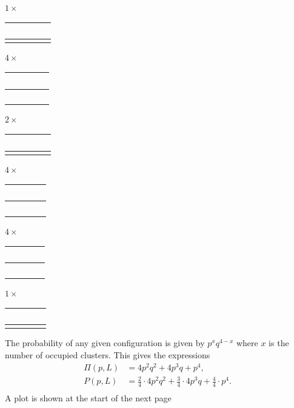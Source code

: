 \documentclass[a4paper, 11pt, notitlepage, english]{article}
\begin{document}
\begin{center}
$1\times$
\begin{tabular}{|c|c|}
  \hline
  \ \ \ &  \ \ \  \\ \hline
  \qquad & \qquad \\
  \hline
\end{tabular} \qquad
\qquad $4\times$
\begin{tabular}{|c|c|}
  \hline
  \ \ \cellcolor{black} &  \ \ \  \\ \hline
  \ \ \ & \qquad \\
  \hline
\end{tabular} \qquad 
\qquad $2\times$
\begin{tabular}{|c|c|}
  \hline
  \ \ \ & \cellcolor{black} \ \ \  \\ \hline
  \cellcolor{black} & \qquad \\
  \hline
\end{tabular}	

$4\times$
\begin{tabular}{|c|c|}
  \hline
  \ \ \cellcolor{black}&  \ \ \  \\ \hline
  \ \ \cellcolor{black} & \qquad \\
  \hline
\end{tabular} \qquad
\qquad $4\times$
\begin{tabular}{|c|c|}
  \hline
  \  \cellcolor{black} & \cellcolor{black} \ \ \  \\ \hline
  \ \  \cellcolor{black} & \qquad \\
  \hline
\end{tabular} \qquad 
\qquad $1\times$
\begin{tabular}{|c|c|}
  \hline
  \ \ \cellcolor{black} & \cellcolor{black} \ \ \  \\ \hline
  \cellcolor{black} & \cellcolor{black} \qquad \\
  \hline
\end{tabular}	
\end{center}
The probability of any given configuration is given by $p^x q^{4-x}$ where $x$ is the number of occupied clusters. This gives the expressions
\begin{align*}
\Pi(p, L) &= 4p^2q^2 + 4p^3q + p^4, \\
P(p, L) &= \frac{2}{4}\cdot 4p^2q^2 + \frac{3}{4}\cdot 4p^3q + \frac{4}{4}\cdot p^4. \\
\end{align*}
A plot is shown at the start of the next page 
\end{document}
